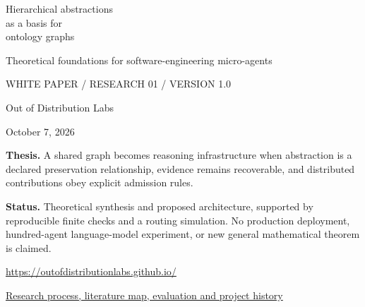 \documentclass[11pt]{article}
\begin{document}
\begin{titlepage}
\vspace*{.1cm}
\vspace{.8cm}
{\color{white}\fontsize{29}{34}\selectfont Hierarchical abstractions\\as a basis for\\ontology graphs\par}
\vspace{.4cm}
{\color{Champagne}\normalsize Theoretical foundations for software-engineering micro-agents\par}
\vspace{2.2cm}
{\color{Muted}\small WHITE PAPER / RESEARCH 01 / VERSION 1.0\par}
\vspace{.6cm}
{\Large Out of Distribution Labs\par}
October 7, 2026\par
\vspace{.9cm}
\textbf{Thesis.} A shared graph becomes reasoning infrastructure when abstraction is a declared preservation relationship, evidence remains recoverable, and distributed contributions obey explicit admission rules.\par
\vspace{.25cm}
\textbf{Status.} Theoretical synthesis and proposed architecture, supported by reproducible finite checks and a routing simulation. No production deployment, hundred-agent language-model experiment, or new general mathematical theorem is claimed.\par
\vfill
{\small\url{https://outofdistributionlabs.github.io/}\par
\href{https://outofdistributionlabs.github.io/research/hierarchical-abstractions/progress.html}{Research process, literature map, evaluation and project history}\par}
\end{titlepage}
\end{document}
